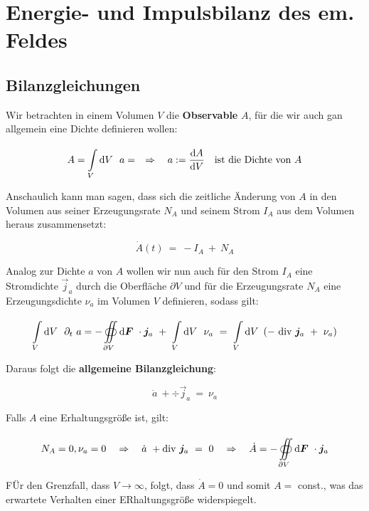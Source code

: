 \chapter{Energie- und Impulsbilanz des em. Feldes}

\section{Bilanzgleichungen}

Wir betrachten in einem Volumen $V$ die \textbf{Observable} $A$, für die wir auch gan allgemein eine Dichte definieren wollen:

\begin{equation}
A=\int\limits_{{V}}^{{}}\mathrm{d}{V}\  \ a =  \quad \Rightarrow \quad a := \frac{\mathrm{d}{A}}{\mathrm{d}{V}} \quad \text{ist die Dichte von } A
\end{equation}

Anschaulich kann man sagen, dass sich die zeitliche Änderung von $A$ in den Volumen aus seiner Erzeugungsrate $N_A$ und seinem Strom $I_A$ aus dem Volumen heraus zusammensetzt:

\begin{equation*}
\dot{A}(t) \ = \ - I_A \ + \ N_A
\end{equation*}

Analog zur Dichte $a$ von $A$ wollen wir nun auch für den Strom $I_A$ eine Stromdichte $\vec{j}_a$ durch die Oberfläche $\partial V$ und für die Erzeugungsrate $N_A$ eine Erzeugungsdichte $\nu_a$ im Volumen $V$ definieren, sodass gilt:

\begin{equation*}
\Int{V}{}{V} \ \partial_t \ a = -\Oiint{\partial V}{}{\vec{F}} \cdot\vec{j}_a \ + \ \Int{V}{}{V} \ \nu_a \ = \ \Int{V}{}{V} \left(- \ \div\vec{j}_a \ + \ \nu_a\right)
\end{equation*} 

Daraus folgt die \textbf{allgemeine Bilanzgleichung}:

\begin{equation*}
\dot{a} \ +  \div\vec{j}_a \  =  \ \nu_a
\end{equation*}

Falls $A$ eine Erhaltungsgröße ist, gilt:

\begin{equation*}
N_A = 0, \nu_a = 0 \quad \Rightarrow \quad \dot{a}  \ + \text{div } \bm{j}_a \ = \ 0 \quad \Rightarrow \quad \dot{A} = -\oiint\limits_{{\partial V}}^{{}}\mathrm{d}{\bm{F}}\ \cdot\bm{j}_a
\end{equation*}

FÜr den Grenzfall, dass $V\rightarrow\infty$, folgt, dass $\dot{A}=0$ und somit $A =$ const., was das erwartete Verhalten einer ERhaltungsgröße widerspiegelt.

